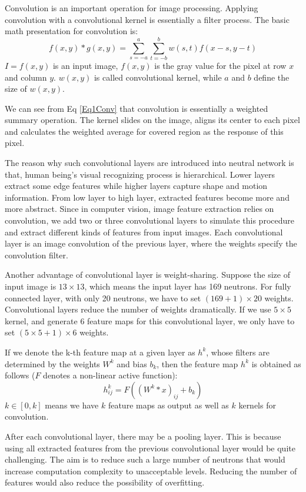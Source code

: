 Convolution is an important operation for image processing. Applying convolution with a convolutional kernel is essentially a filter process. The basic math presentation for convolution is:
\begin{equation}
f(x,y)\ast g(x,y)=\sum_{s=-a}^{a} \sum_{t=-b}^{b} w(s,t)f(x-s,y-t)
\label{Eq1Conv}
\end{equation}
$I=f(x,y)$ is an input image, $f(x,y)$ is the gray value for the pixel at row $x$ and column $y$. $w(x,y)$ is called convolutional kernel, while $a$ and $b$ define the size of $w(x,y)$.

We can see from Eq \eqref{Eq1Conv} that convolution is essentially a weighted summary operation. The kernel slides on the image, aligns its center to each pixel and calculates the weighted average for covered region as the response of this pixel.

The reason why such convolutional layers are introduced into neutral network is that, human being's visual recognizing process is hierarchical. Lower layers extract some edge features while higher layers capture shape and motion information. From low layer to high layer, extracted features become more and more abstract. Since in computer vision, image feature extraction relies on convolution, we add two or three convolutional layers to simulate this procedure and extract different kinds of features from input images. Each convolutional layer is an image convolution of the previous layer, where the weights specify the convolution filter.

Another advantage of convolutional layer is weight-sharing. Suppose the size of input image is $13\times 13$, which means the input layer has 169 neutrons. For fully connected layer, with only 20 neutrons, we have to set $(169+1)\times 20$ weights. Convolutional layers reduce the number of weights dramatically. If we use $5\times 5$ kernel, and generate 6 feature maps for this convolutional layer, we only have to set $(5\times 5+1)\times 6$ weights.

If we denote the k-th feature map at a given layer as $h^k$, whose filters are determined by the weights $W^k$ and bias $b_k$, then the feature map $h^k$ is obtained as follows ($F$ denotes a non-linear active function):
\begin{equation}
h_{ij}^k=F((W^k\ast x)_{ij}+b_k)
\end{equation}
$k\in [0,k]$ means we have $k$ feature maps as output as well as $k$ kernels for convolution. 

After each convolutional layer, there may be a pooling layer. This is because using all extracted features from the previous convolutional layer would be quite challenging. The aim is to reduce such a large number of neutrons that would increase computation complexity to unacceptable levels. Reducing the number of features would also reduce the possibility of overfitting.

